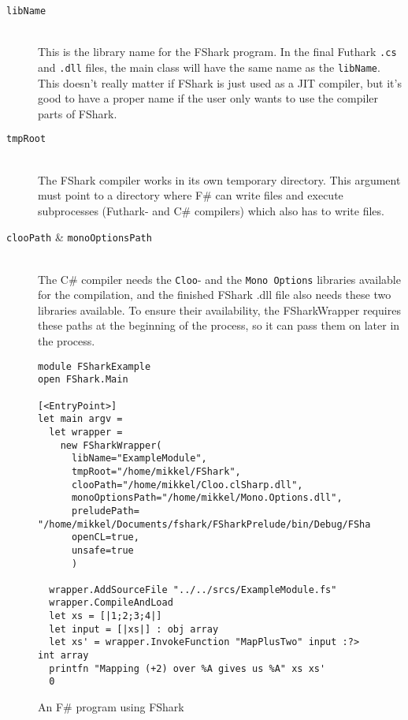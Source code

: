 \begin{description}
\item[\texttt{libName}]\hfill\\
  This is the library name for the FShark program. In the final Futhark
  \texttt{.cs} and \texttt{.dll} files, the main class will have the same name
  as the \texttt{libName}. This doesn't really matter if FShark is just used
  as a JIT compiler, but it's good to have a proper name if the user only wants
  to use the compiler parts of FShark.

\item[\texttt{tmpRoot}]\hfill\\
  The FShark compiler works in its own temporary directory. This argument must
  point to a directory where F\# can write files and execute subprocesses
  (Futhark- and C\# compilers) which also has to write files.
  
\item[\texttt{clooPath} \& \texttt{monoOptionsPath}]\hfill\\
  The C\# compiler needs the \texttt{Cloo}- and the \texttt{Mono Options}
  libraries available for the compilation, and the finished FShark .dll file
  also needs these two libraries available. To ensure their availability, the
  FSharkWrapper requires these paths at the beginning of the process, so it can
  pass them on later in the process.

  

\end{description}


\begin{figure}
  \centering
    \begin{verbatim}
module FSharkExample
open FShark.Main

[<EntryPoint>]
let main argv =
  let wrapper = 
    new FSharkWrapper(
      libName="ExampleModule",
      tmpRoot="/home/mikkel/FShark",
      clooPath="/home/mikkel/Cloo.clSharp.dll",
      monoOptionsPath="/home/mikkel/Mono.Options.dll",
      preludePath= "/home/mikkel/Documents/fshark/FSharkPrelude/bin/Debug/FSharkPrelude.dll",
      openCL=true,
      unsafe=true
      )

  wrapper.AddSourceFile "../../srcs/ExampleModule.fs"
  wrapper.CompileAndLoad
  let xs = [|1;2;3;4|]
  let input = [|xs|] : obj array
  let xs' = wrapper.InvokeFunction "MapPlusTwo" input :?> int array
  printfn "Mapping (+2) over %A gives us %A" xs xs'
  0
    \end{verbatim}
  \caption{An F\# program using FShark}
  \label{fig:fsharkusageexample}
\end{figure}














